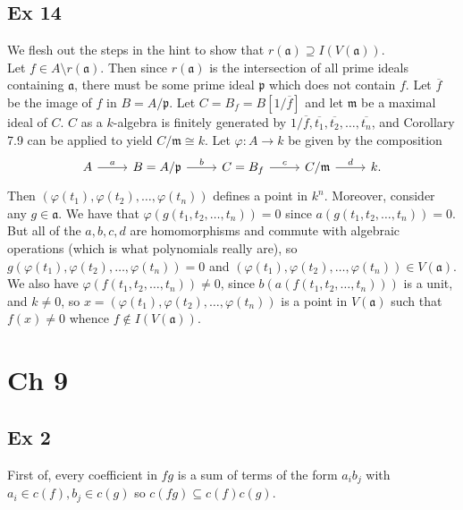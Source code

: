 \documentclass{article}
\let\temp\phi
\let\phi\varphi
\let\varphi\temp
\theoremstyle{definition}
\begin{document}
\subsection*{Ex 14}

We flesh out the steps in the hint to show that $r(\mathfrak{a}) \supseteq
I(V(\mathfrak{a}))$. \\

Let $f \in A \setminus r(\mathfrak{a})$. Then since $r(\mathfrak{a})$ is the
intersection of all prime ideals containing $\mathfrak{a}$, there must be some
prime ideal $\mathfrak{p}$ which does not contain $f$. Let $\overline{f}$ be
the image of $f$ in $B = A/\mathfrak{p}$. Let $C = B_{f} = B[1/\overline{f}]$
and let $\mathfrak{m}$ be a maximal ideal of $C$. $C$ as a $k$-algebra is
finitely generated by $1/\overline{f}, \overline{t_1}, \overline{t_2}, \ldots,
\overline{t_n}$, and Corollary 7.9 can be applied to yield $C/\mathfrak{m}
\cong k$. Let $\phi: A \to k$ be given by the composition
\[
\begin{tikzcd}
	A \arrow[r, "a"] & 
	B = A / \mathfrak{p} \arrow[r, "b"] &
	C = B_{f} \arrow[r, "c"] &
	C / \mathfrak{m} \arrow[r, "d"] &
	k.
\end{tikzcd}
\] 
Then $(\phi(t_1), \phi(t_2), \ldots, \phi(t_n))$ defines a point in $k^{n}$.
Moreover, consider any $g \in \mathfrak{a}$. We have that $\phi(g(t_1, t_2,
\ldots, t_n)) = 0$ since $a(g(t_1, t_2, \ldots, t_n)) = 0$. But all of the $a,
b, c, d$ are homomorphisms and commute with algebraic operations (which is what
polynomials really are), so $g(\phi(t_1), \phi(t_2), \ldots, \phi(t_n)) = 0$
and $(\phi(t_1), \phi(t_2), \ldots, \phi(t_n)) \in V(\mathfrak{a})$. We also
have $\phi(f(t_1, t_2, \ldots, t_n)) \not = 0$, since $b(a(f(t_1, t_2, \ldots,
t_n)))$ is a unit, and $k \not = 0$, so $x = (\phi(t_1), \phi(t_2), \ldots,
\phi(t_n))$ is a point in $V(\mathfrak{a})$ such that $f(x) \not = 0$ whence $f
\not \in I(V(\mathfrak{a})).$

\section*{Ch 9}


\subsection*{Ex 2}


First of, every coefficient in $fg$ is a sum of terms of the form $a_i b_j$
with $a_i \in c(f), b_j \in c(g)$ so $c(fg) \subseteq c(f)c(g)$. \\
\end{document}
